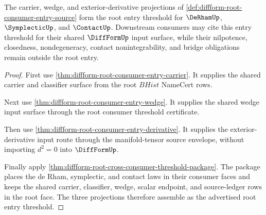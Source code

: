 \begin{theorem}
\label{thm:diffform-root-consumer-entry-threshold}
The carrier, wedge, and exterior-derivative projections of
\autoref{def:diffform-root-consumer-entry-source} form the root entry
threshold for $\DeRhamUp$, $\SymplecticUp$, and $\ContactUp$. Downstream
consumers may cite this entry threshold for their shared $\DiffFormUp$ input
surface, while their nilpotence, closedness, nondegeneracy, contact
nonintegrability, and bridge obligations remain outside the root entry.
\end{theorem}
\begin{proof}
First use \autoref{thm:diffform-root-consumer-entry-carrier}. It supplies the
shared carrier and classifier surface from the root $BHist$ NameCert rows.

Next use \autoref{thm:diffform-root-consumer-entry-wedge}. It supplies the
shared wedge input surface through the root consumer threshold certificate.

Then use \autoref{thm:diffform-root-consumer-entry-derivative}. It supplies
the exterior-derivative input route through the manifold-tensor source
envelope, without importing $d^2=0$ into $\DiffFormUp$.

Finally apply
\autoref{thm:diffform-root-cross-consumer-threshold-package}. The package
places the de Rham, symplectic, and contact laws in their consumer faces and
keeps the shared carrier, classifier, wedge, scalar endpoint, and
source-ledger rows in the root face. The three projections therefore assemble
as the advertised root entry threshold.
\end{proof}
